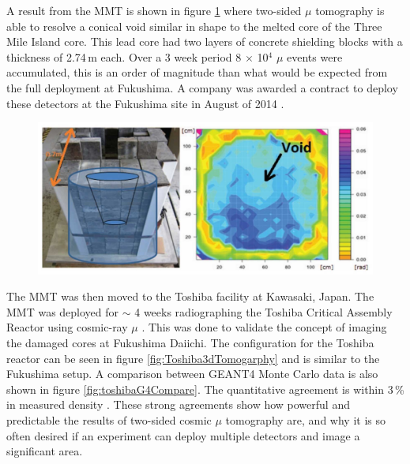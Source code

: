 A result from the MMT is shown in figure \ref{fig:fukushimaFakeCore} where two-sided $\mu$ tomography is able to resolve a conical void similar in shape to the melted core of the Three Mile Island core. This lead core had two layers of concrete shielding blocks with a thickness of 2.74\,m each. Over a 3 week period 8 $\times$ 10$^4$ $\mu$ events were accumulated, this is an order of magnitude than what would be expected from the full deployment at Fukushima. A company was awarded a contract to deploy these detectors at the Fukushima site in August of 2014 \cite{compnayFukushimaWeb}.

\begin{figure}[!h]
 \centering
 \includegraphics[width=0.7\linewidth]{Chapter5/Figs/MuTomographyExamples/FukushimaFakeCore.jpg}
 \label{fig:fukushimaFakeCore}
\end{figure}

The MMT was then moved to the Toshiba facility at Kawasaki, Japan. The MMT was deployed for $\sim$ 4 weeks radiographing the Toshiba Critical Assembly Reactor using cosmic-ray $\mu$ \cite{morris2014analysis}. This was done to validate the concept of imaging the damaged cores at Fukushima Daiichi. The configuration for the Toshiba reactor can be seen in figure \ref{fig:Toshiba3dTomogarphy} and is similar to the Fukushima setup. A comparison between GEANT4 Monte Carlo data is also shown in figure \ref{fig:toshibaG4Compare}. The quantitative agreement is within 3\,\% in measured density \cite{morris2014analysis}. These strong agreements show how powerful and predictable the results of two-sided cosmic $\mu$ tomography are, and why it is so often desired if an experiment can deploy multiple detectors and image a significant area. 

